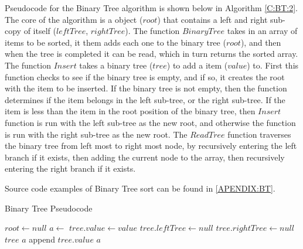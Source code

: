 \documentclass{subfile}
\begin{document}
\begin{multicols}{2}
 \par
 Pseudocode for the Binary Tree algorithm is shown below in Algorithm \ref{C:BT:2}. The core of the algorithm is a object ($root$) that contains a left and right sub-copy of itself ($leftTree$, $rightTree$). The function $BinaryTree$ takes in an array of items to be sorted, it them adds each one to the binary tree ($root$), and then when the tree is completed it can be read, which in turn returns the sorted array. The function $Insert$ takes a binary tree ($tree$) to add a item ($value$) to. First this function checks to see if the binary tree is empty, and if so, it creates the root with the item to be inserted. If the binary tree is not empty, then the function determines if the item belongs in the left sub-tree, or the right sub-tree. If the item is less than the item in the root position of the binary tree, then $Insert$ function is run with the left sub-tree as the new root, and otherwise the function is run with the right sub-tree as the new root. The $ReadTree$ function traverses the binary tree from left most to right most node, by recursively entering the left branch if it exists, then adding the current node to the array, then recursively entering the right branch if it exists.
 \par
 Source code examples of Binary Tree sort can be found in \ref{APENDIX:BT}.
\end{multicols}
\newpage
\begin{algorithm}
 \caption{Binary Tree Pseudocode}\label{C:BT:2}
 \begin{algorithmic}[1]
  \State $root\gets null$
  \State {}
  \EndFor
  \State $a \gets $
  \EndFunction
  \State $tree.value \gets value$
  \State $tree.leftTree \gets null$
  \State $tree.rightTree \gets null$
  \State {}
  \Else
  \State {}
  \EndIf
  \State \Return $tree$
  \EndFunction
  \State {}
  \State $a$ append $tree.value$
  \State {}
  \EndIf
  \State \Return $a$
  \EndFunction
 \end{algorithmic}
\end{algorithm}
\newpage
\end{document}
